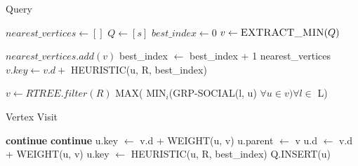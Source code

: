 \begin{algorithm}[t]
\caption{{\query} Query}
\begin{scriptsize}
\label{alg3}
\begin{algorithmic}[1]
	\State $nearest\_vertices \gets []$
	\State $Q \gets [s]$
	\State $best\_index \gets 0$
	  \label{alg:theqstart}
		\State $v \gets \Call{EXTRACT\_MIN}{Q}$
		
			\State $nearest\_vertices.add(v)$
			\State best\_index $\gets$ best\_index + 1
				\State \Return nearest\_vertices
			\EndIf
			 
				\State $v.key \gets v.d +$ HEURISTIC(u, R, best\_index)
			\EndFor
		\EndIf
		
			\State {}
		\EndIf
	\EndWhile	\label{alg:theqend}
\EndFunction

	\State $v \gets RTREE.filter(R)$   	
	\State \Return MAX( MIN$_i$(GRP-SOCIAL(l, u) $\forall u \in v) \forall l \in$ L)
\EndFunction

\end{algorithmic}

\end{scriptsize}
\end{algorithm}


\begin{algorithm}[t]
\caption{Vertex Visit}
\begin{scriptsize}
\label{alg4}
\begin{algorithmic}[1]
		 \label{alg:liesin}
			\State \textbf{continue}
		\EndIf
					\State \textbf{continue}
				\Else
					\State u.key $\gets$ v.d + WEIGHT(u, v)
				\EndIf
			\Else
				\State u.parent $\gets$ v
				\State u.d $\gets$ v.d + WEIGHT(u, v)
				\State u.key $\gets$ HEURISTIC(u, R, best\_index)
				\State Q.INSERT(u)
			\EndIf
		\EndIf
	\EndFor
\EndFunction
\end{algorithmic}

\end{scriptsize}
\end{algorithm}

